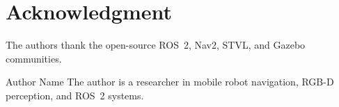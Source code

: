 \documentclass[journal]{IEEEtran}
\begin{document}
\section*{Acknowledgment}
The authors thank the open-source ROS~2, Nav2, STVL, and Gazebo communities.




\begin{IEEEbiographynophoto}{Author Name}
The author is a researcher in mobile robot navigation, RGB-D perception, and ROS~2
systems.
\end{IEEEbiographynophoto}
\end{document}

